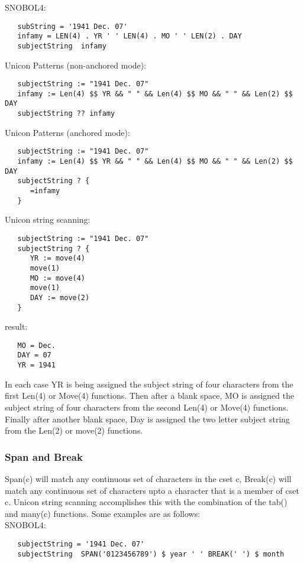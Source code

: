 \documentclass{article}
\begin{document}
\noindent
SNOBOL4:
\linespread{1}
\begin{verbatim}
   subString = '1941 Dec. 07' 
   infamy = LEN(4) . YR ' ' LEN(4) . MO ' ' LEN(2) . DAY 
   subjectString  infamy 
\end{verbatim}

\noindent
Unicon Patterns (non-anchored mode):
\begin{verbatim}
   subjectString := "1941 Dec. 07"
   infamy := Len(4) $$ YR && " " && Len(4) $$ MO && " " && Len(2) $$ DAY 
   subjectString ?? infamy
\end{verbatim}
\noindent
Unicon Patterns (anchored mode):
\begin{verbatim}
   subjectString := "1941 Dec. 07"
   infamy := Len(4) $$ YR && " " && Len(4) $$ MO && " " && Len(2) $$ DAY 
   subjectString ? {
      =infamy
   }
\end{verbatim}

\noindent
Unicon string scanning:
\begin{verbatim}
   subjectString := "1941 Dec. 07"
   subjectString ? {
      YR := move(4)
      move(1)
      MO := move(4)
      move(1)
      DAY := move(2)
   }
\end{verbatim}

\noindent
result:
\begin{verbatim}
   MO = Dec.
   DAY = 07
   YR = 1941
\end{verbatim}

In each case YR is being assigned the subject string of four characters from the first Len(4) or Move(4) functions.  Then after a blank space, MO is assigned the subject string of four characters from the second Len(4) or Move(4) functions.  Finally after another blank space, Day is assigned the two letter subject string from the Len(2) or move(2) functions.

\vspace{2 pc}
\subsubsection{Span and Break}
Span(c) will match any continuous set of characters in the cset c, Break(c) will match any continuous set of characters upto a character that is a member of cset c.  Unicon string scanning accomplishes this with the combination of the tab() and many(c) functions. Some examples are as follows: \\

\noindent
SNOBOL4:
\begin{verbatim}
   subjectString = '1941 Dec. 07'
   subjectString  SPAN('0123456789') $ year ' ' BREAK(' ') $ month
\end{verbatim}
\end{document}
